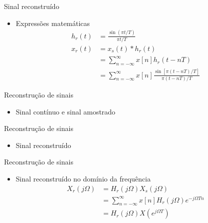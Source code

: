 \begin{slide}{Sinal reconstru\'ido}
\begin{itemize}
   \item Expressões matemáticas
   \begin{align}
      h_r(t) &= \frac{\sin(\pi t/T)}{\pi t/T}\\
      x_r(t) &= x_s(t)*h_r(t)\\
             &= \sum_{n=-\infty}^{\infty}x[n]h_r(t-nT)\\
             &= \sum_{n=-\infty}^{\infty}x[n]\frac{\sin[\pi (t-nT)/T]}{\pi (t-nT)/T}
   \end{align}
\end{itemize}
\end{slide}

\begin{slide}{Reconstru\c c\~ao de sinais}
\begin{itemize}
   \item Sinal cont\'inuo e sinal amostrado
   \begin{figure}
      \centering
   \end{figure}
\end{itemize}
\end{slide}

\begin{slide}{Reconstru\c c\~ao de sinais}
\begin{itemize}
   \item Sinal reconstru\'ido
   \begin{figure}
      \centering
   \end{figure}
\end{itemize}
\end{slide}

\begin{slide}{Reconstru\c c\~ao de sinais}
\begin{itemize}
   \item Sinal reconstru\'ido no dom\'inio da frequ\^encia 
   \begin{align}
      X_r(j\Omega) &= H_r(j\Omega)X_s(j\Omega)\\
                   &= \sum_{n=-\infty}^{\infty}x[n]H_r(j\Omega)e^{-j\Omega Tn}\\
                   &= H_r(j\Omega)X(e^{j\Omega T})             
   \end{align}
\end{itemize}
\end{slide}


